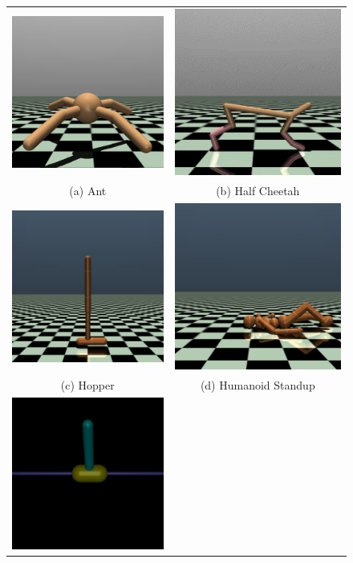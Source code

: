 \documentclass[sigconf]{acmart}
\begin{document}
\begin{figure}[t]
  \centering
  \begin{tabular}{cc}
    \includegraphics[width=0.3\linewidth]{assets/ant} &
    \includegraphics[width=0.3\linewidth]{assets/half_cheetah} \\
    (a) Ant & (b) Half Cheetah \\
    \includegraphics[width=0.3\linewidth]{assets/hopper} &
    \includegraphics[width=0.3\linewidth]{assets/humanoid_standup} \\
    (c) Hopper & (d) Humanoid Standup \\
    \includegraphics[width=0.3\linewidth]{assets/inverted_pendulum} &

\end{tabular}
\end{figure}
\end{document}
